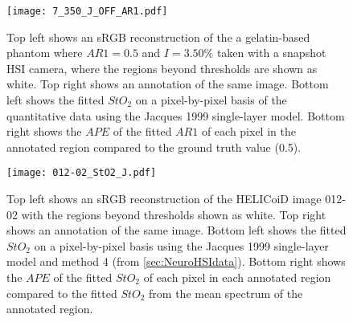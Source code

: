 \begin{figure}[h!]
    \centering 
    \texttt{[image: 7\_350\_J\_OFF\_AR1.pdf]}
    \caption{Top left shows an sRGB reconstruction of the a gelatin-based phantom where $AR1=0.5$ and $I=3.50\%$ taken with a snapshot HSI camera, where the regions beyond thresholds are shown as white. Top right shows an annotation of the same image. Bottom left shows the fitted $StO_2$ on a pixel-by-pixel basis of the quantitative data using the Jacques 1999 single-layer model. Bottom right shows the $APE$ of the fitted $AR1$ of each pixel in the annotated region compared to the ground truth value (0.5).}
    \label{ap:gelatinpbpegQJ}
\end{figure}

\begin{figure}[h!]
    \centering 
    \texttt{[image: 012-02\_StO2\_J.pdf]}
    \caption{Top left shows an sRGB reconstruction of the HELICoiD image 012-02 with the regions beyond thresholds shown as white. Top right shows an annotation of the same image. Bottom left shows the fitted $StO_2$ on a pixel-by-pixel basis using the Jacques 1999 single-layer model and method 4 (from \ref{sec:NeuroHSIdata}). Bottom right shows the $APE$ of the fitted $StO_2$ of each pixel in each annotated region compared to the fitted $StO_2$ from the mean spectrum of the annotated region.}
    \label{ap:HELICoiDpixelJ}
\end{figure}
\FloatBarrier

